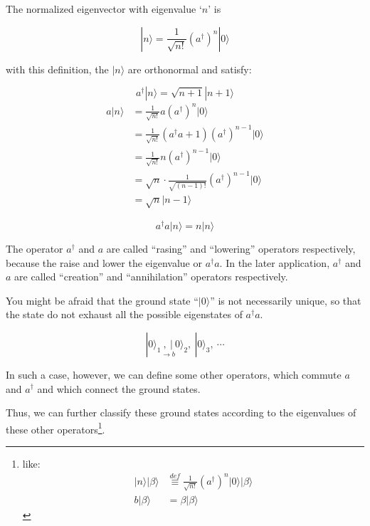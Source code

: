 The normalized eigenvector with eigenvalue `$n$' is

\begin{equation}
|n\rangle = \frac{1}{\sqrt{n!}}(a^{\dagger})^n|0\rangle
\end{equation}

with this definition, the $|n\rangle$ are orthonormal and satisfy:

\begin{equation}\label{1.1.2}
a^{\dagger}|n\rangle = \sqrt{n+1}|n+1\rangle
\end{equation}
\begin{equation}\label{1.1.3}
\begin{split}
a|n\rangle &= \frac{1}{\sqrt{n!}}a(a^{\dagger})^n|0\rangle\\
&=\frac{1}{\sqrt{n!}}(a^{\dagger}a+1)(a^{\dagger})^{n-1}|0\rangle\\
&=\frac{1}{\sqrt{n!}}n(a^{\dagger})^{n-1}|0\rangle\\
&=\sqrt{n}\cdot\frac{1}{\sqrt{(n-1)!}}(a^{\dagger})^{n-1}|0\rangle\\
&=\sqrt{n}|n-1\rangle
\end{split}
\end{equation}

\[a^{\dagger}a|n\rangle = n|n\rangle \]

The operator $a^{\dagger}$ and $a$ are called ``rasing'' and ``lowering'' operators respectively, because the raise and lower the eigenvalue or $a^{\dagger}a$.
In the later application, $a^{\dagger}$ and $a$ are called ``creation'' and ``annihilation'' operators respectively.

You might be afraid that the ground state ``$|0\rangle$'' is not necessarily unique, so that the state do not exhaust all the possible eigenstates of $a^{\dagger}a$.

\[|0\rangle_1\underset{\rightarrow b}{,\ |}0\rangle_2,\ |0\rangle_3,\ \cdots \]

In such a case, however, we can define some other operators, which commute $a$ and $a^{\dagger}$ and which connect the ground states.

Thus, we can further classify these ground states according to the eigenvalues of these other operators\footnote{like:
\[\begin{split}|n\rangle|\beta\rangle &\overset{def}{\equiv}\frac{1}{\sqrt{n!}}(a^{\dagger})^n|0\rangle|\beta\rangle \\
b|\beta\rangle &= \beta|\beta\rangle
\end{split}\]}.



